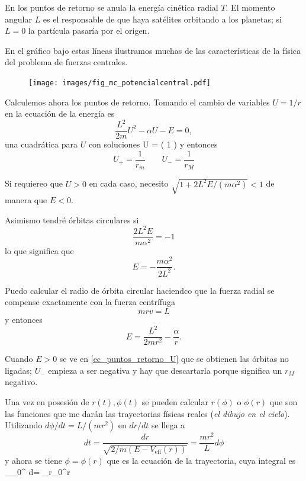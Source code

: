 \documentclass[10pt,oneside]{CBFT_book}
\begin{document}
En los puntos de retorno se anula la energía cinética radial $T$.
El momento angular $L$ es el responsable de que haya satélites orbitando a los planetas; si $L=0$ la partícula pasaría 
por el origen.

En el gráfico bajo estas líneas ilustramos muchas de las características de la física del problema
de fuerzas centrales.

\begin{figure}[!hbt]
	\begin{center}
	\texttt{[image: images/fig\_mc\_potencialcentral.pdf]}	 
	\end{center}
	\caption{}
\end{figure} 


Calculemos ahora los puntos de retorno.
Tomando el cambio de variables $U=1/r$ en la ecuación de la energía es
\[
	\frac{L^2}{2m} U^2 - \alpha U - E = 0,
\]
una cuadrática para $U$ con soluciones
\be
	U = \left( 1 \pm {}\right)
	\label{ec_puntos_retorno_U}
\ee
y entonces
\[
	U_+ = \frac{1}{r_m} \qquad U_- = \frac{1}{r_M}
\]

Si requiereo que $U>0$ en cada caso, necesito $ \sqrt{1 + 2L^2E/(m\alpha^2) } < 1 $ de manera que $ E < 0 $.

Asimismo tendré órbitas circulares si
\[
	\frac{ 2 L^2 E }{ m \alpha^2 } = - 1
\]
lo que significa que 
\[
	E = -\frac{m\alpha^2}{2L^2}.
\]

Puedo calcular el radio de órbita circular haciendco que la fuerza radial se compense exactamente con la fuerza 
centrífuga
\[
	m r v = L
\]
y entonces
\[
	E = \frac{L^2}{2mr^2} - \frac{\alpha}{r}.
\]

Cuando $E>0$ se ve en \eqref{ec_puntos_retorno_U} que se obtienen las órbitas no ligadas; $U_-$ empieza a ser negativa 
y hay que descartarla porque significa un $r_M$ negativo.

Una vez en posesión de $r(t), \phi(t)$ se pueden calcular $r(\phi)$ o $\phi(r)$ que son las funciones que me darán las
trayectorias físicas reales ({\it el dibujo en el cielo}).
Utilizando $d\phi/dt = L/(m r^2 )$ en $dr/dt$ se llega a 
\[
	dt = \frac{dr}{\sqrt{2/m(E-V_{\text{eff}}(r))}}  = \frac{ m r^2 }{ L } d\phi
\]
y ahora se tiene $\phi = \phi(r)$ que es la ecuación de la trayectoria, cuya integral es
\be
	\int_{\phi_0}^{\phi} d\phi = \int_{r_0}^r  
	\label{integral_trayectoria}
\ee
\end{document}
